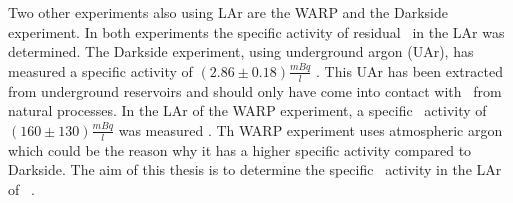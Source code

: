 \documentclass[encoding=utf8,british]{tumphthesis}
\begin{document}

Two other experiments also using LAr are the WARP and the Darkside experiment.
In both experiments the specific activity of residual \Kr\ in the LAr was determined.
The Darkside experiment, using underground argon (UAr), has measured a specific activity of \((2.86\pm0.18) \frac{\unit{mBq}} {\unit{l}}\)  \cite{agnes_results_2016}.
This UAr has been extracted from underground reservoirs and should only have come into contact with \Kr\ from natural processes.
In the LAr of the WARP experiment, a specific \Kr\ activity of   \((160\pm130)\frac{\unit{mBq}}{\unit{l}}\) was measured \cite{benetti_measurement_2006}.
Th WARP experiment uses atmospheric argon which could be the reason why it has a higher specific activity compared to Darkside.
The aim of this thesis is to determine the specific \Kr\ activity in the LAr of \gerda\ \PII.

 
 
 
 
 
 
 
 
 
 
 
 
 
 
 
 
 
 
 
 
 
 
 
 
 
 
 
 
 
 
 
 
 
 
 
 
 
 
 
 
 
 
\end{document}
